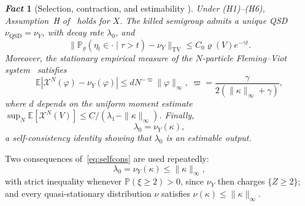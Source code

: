 \documentclass[letterpaper, 10pt, conference]{ieeeconf}
\newtheorem{fact}{\it \textbf{Fact}}
\newcommand{\E}{\mathbb{E}}
\newcommand{\rev}[1]{#1}
\begin{document}
\begin{fact}[Selection, contraction, and estimability {\rm\cite[Thms.~3.6, 3.8, Cor.~3.9]{companion}}]
\label{fact:selection}
Under {\rm(H1)--(H6)}, Assumption~H of~\cite{cv1} holds for $X$. The killed
semigroup admits a unique QSD $\nu_{\mathrm{QSD}}=\nu_Y$, with decay rate
$\lambda_0$, and
\[
\|\mathbb P_\varrho(\eta_t\in\cdot\mid\tau>t)-\nu_Y\|_{\mathrm{TV}}
\le C_0\varrho(V)e^{-\gamma t}.
\]
Moreover, the stationary empirical measure of the $N$-particle Fleming--Viot
system~\cite{villemonais} satisfies
\begin{equation}
\E\!\left|\mathcal X^N(\varphi)-\nu_Y(\varphi)\right|
\le dN^{-\varpi}\|\varphi\|_\infty,
\;
\varpi=\frac{\gamma}{2(\|\kappa\|_\infty+\gamma)},
\label{eq:rate}
\end{equation}
where $d$ depends on the uniform moment estimate
$\sup_N\E[\mathcal X^N(V)]\le C/(\lambda_1-\|\kappa\|_\infty)$. Finally,
\begin{equation}
\lambda_0=\nu_Y(\kappa),
\label{eq:selfcons}
\end{equation}
a self-consistency identity showing that $\lambda_0$ is an estimable output.
\end{fact}
Two consequences of~\eqref{eq:selfcons} are used repeatedly:
\begin{equation}
\lambda_0=\nu_Y(\kappa)\le\|\kappa\|_\infty,
\label{eq:lam0kappa}
\end{equation}
with strict inequality whenever $\mathbb P(\xi\ge2)>0$, since $\nu_Y$ then
charges $\{Z\ge2\}$; and every quasi-stationary distribution $\nu$ satisfies
$\nu(\kappa)\le\|\kappa\|_\infty$.

\end{document}
